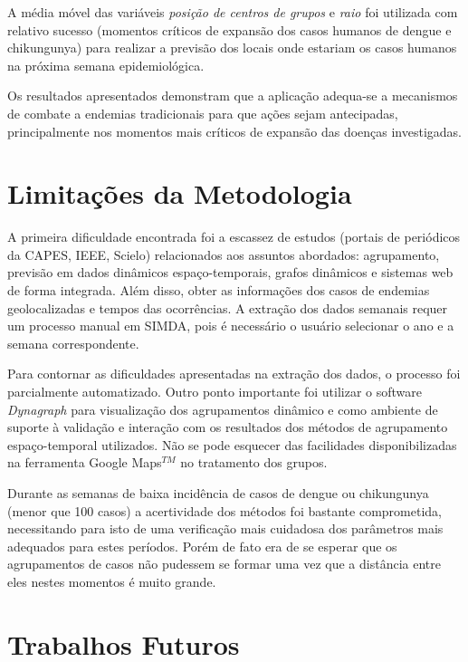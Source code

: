 A média móvel das variáveis \emph{posição de centros de grupos} e \emph{raio}  foi utilizada com relativo sucesso (momentos críticos de expansão dos casos humanos de dengue e chikungunya) para realizar a previsão dos locais onde estariam os casos humanos na próxima semana epidemiológica.   

Os resultados apresentados demonstram que a aplicação adequa-se a mecanismos de combate a endemias tradicionais para que ações sejam antecipadas, principalmente nos momentos mais críticos de expansão das doenças investigadas. 

\section{Limitações da Metodologia}
\label{sec:limitacoes}

A primeira dificuldade encontrada foi a escassez de estudos (portais de periódicos da \acrshort{CAPES}, \acrshort{IEEE}, Scielo) relacionados aos assuntos abordados: agrupamento, previsão em dados dinâmicos espaço-temporais, grafos dinâmicos e sistemas web de forma integrada. Além disso, obter as informações dos casos de endemias geolocalizadas e tempos das ocorrências. A extração dos dados semanais requer um processo manual em \acrshort{SIMDA}, pois é necessário o usuário selecionar o ano e a semana correspondente.

Para contornar as dificuldades apresentadas na extração dos dados, o processo foi parcialmente automatizado. Outro ponto importante foi utilizar o software \emph{Dynagraph} para visualização dos agrupamentos dinâmico e como ambiente de suporte à validação e interação com os resultados dos métodos de agrupamento espaço-temporal utilizados. Não se pode esquecer das facilidades disponibilizadas na ferramenta Google Maps$^{TM}$ no tratamento dos grupos.

Durante as semanas de baixa incidência de casos de dengue ou chikungunya (menor que 100 casos) a acertividade dos métodos foi bastante comprometida, necessitando para isto de uma verificação mais cuidadosa dos parâmetros mais adequados para estes períodos. Porém de fato era de se esperar que os agrupamentos de casos não pudessem se formar uma vez que a distância entre eles nestes momentos é muito grande.

\section{Trabalhos Futuros}
\label{sec:trabalhos-futuros}

